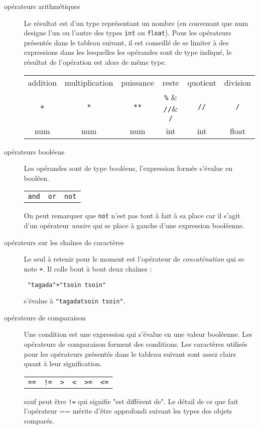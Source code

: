 \begin{description}
 \item[opérateurs arithmétiques] Le résultat est d'un type représentant un nombre (en convenant que num designe l'un ou l'autre des types \verb|int| ou \verb|float|). Pour les opérateurs présentés dans le tableau suivant, il est conseillé de se limiter à des expressions dans les lesquelles les opérandes sont de type indiqué, le résultat de l'opération est alors de même type.
 {%
\begin{center}
\begin{tabular}{cccccc}
addition & multiplication & puissance & reste & quotient & division \\
\verb|+| & \verb|*| & \verb|**| & \verb|%| & \verb|//|& \verb|/|    \\
num      & num      & num       & int      & int      & float    \\
 \end{tabular}
 \end{center}
}%

\item[opérateurs booléens] Les opérandes sont de type booléens, l'expression formée s'évalue en booléen. 
\begin{center}
\begin{tabular}{ccc}
\verb|and| & \verb|or| & \verb|not| \\
 \end{tabular}
\end{center}
On peut remarquer que \verb|not| n'est pas tout à fait à sa place car il s'agit d'un opérateur \emph{unaire} qui se place à gauche d'une expression booléenne.

\item[opérateurs sur les chaînes de caractères] Le seul à retenir pour le moment est l'opérateur de \emph{concaténation} qui se note \verb|+|.\newline
Il colle bout à bout deux chaînes :
\begin{verbatim}
 "tagada"+"tsoin tsoin"
\end{verbatim}
s'évalue à \verb|"tagadatsoin tsoin"|.

\item[opérateurs de comparaison] Une condition est une expression qui s'évalue en une valeur booléenne. Les opérateurs de comparaison forment des conditions. Les caractères utilisés pour les opérateurs présentés dans le tableau suivant sont assez clairs quant à leur signification. 
{%
\begin{center}
\begin{tabular}{cccccc}
\verb|==|  & \verb|!=| & \verb|>|  & \verb|<|  & \verb|>=|  &  \verb|<=|
 \end{tabular}
 \end{center}
}
sauf peut être \verb|!=| qui signifie "est différent de". Le détail de ce que fait l'opérateur == mérite d'être approfondi suivant les types des objets comparés.


\end{description}
